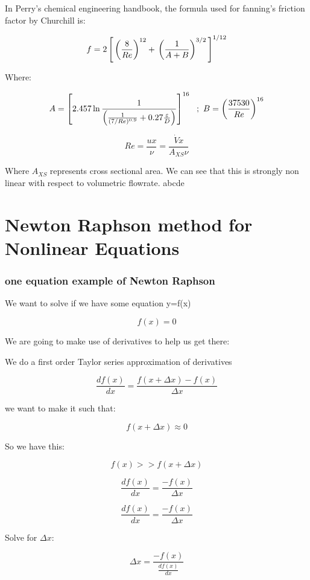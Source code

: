 \documentclass[12pt]{article}
\renewcommand{\_}{\kern-1.5pt\textunderscore\kern-1.5pt}
\begin{document}
In Perry's chemical engineering handbook, the formula used for fanning's friction factor by Churchill is:

$$f = 2 \left[\\
\left( \frac{8}{Re} \right)^{12} + \\
\left( \frac{1}{A+B}\right)^{3/2} \\
\right]^{1/12} $$
 
Where:

$$A = \left[ 2.457 \ln \frac{1}{\left( \frac{1}{(7/Re)^{0.9}} + \\
0.27 \frac{\varepsilon}{D} \right)} \\
\right]^{16}\ \ ; \ \ \\
B = \left( \frac{37530}{Re} \\ 
\right)^{16} $$


$$Re = \frac{ux}{\nu} = \frac{\dot{V} x}{A_{XS} \nu}$$

Where $A_{XS}$ represents cross sectional area.
We can see that this is strongly non linear with respect to volumetric flowrate.
abcde

\part{Newton Raphson method for Nonlinear Equations}

\section{one equation example of Newton Raphson}
We want to solve if we have some equation y=f(x)

$$f(x)=0$$

We are going to make use of derivatives to help us get there:

We do a first order Taylor series approximation of derivatives

$$\frac{d f(x)}{dx} = \frac{f(x + \Delta x) - f(x)}{\Delta x}$$

we want to make it such that:

$$f(x + \Delta x) \approx 0$$

So we have this:

$$f(x) >> f(x+\Delta x)$$

$$\frac{d f(x)}{dx} = \frac{ - f(x)}{\Delta x}$$

$$\frac{d f(x)}{dx} = \frac{ - f(x)}{\Delta x}$$

Solve for $\Delta x$:

$$\Delta x = \frac{ - f(x)}{\frac{d f(x)}{dx}}$$
\end{document}
